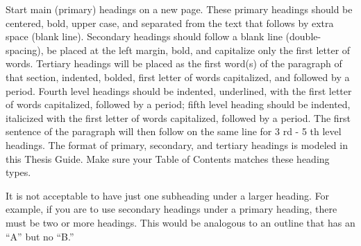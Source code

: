 Start main (primary) headings on a new page. These primary headings should be centered, bold, upper case, and separated from the text that follows by extra space (blank line). Secondary headings should follow a blank line (double-spacing), be placed at the left margin, bold, and capitalize only the first letter of words. Tertiary headings will be placed as the first word(s) of the paragraph of that section, indented, bolded, first letter of words capitalized, and followed by a period. Fourth level headings should be indented, underlined, with the first letter of words capitalized, followed by a period; fifth level heading should be indented, italicized with the first letter of words capitalized, followed by a period. The first sentence of the paragraph will then follow on the same line for 3 rd - 5 th level headings. The format of primary, secondary, and tertiary headings is modeled in this Thesis Guide. Make sure your Table of Contents matches these heading types.

It is not acceptable to have just one subheading under a larger heading. For example, if you are to use secondary headings under a primary heading, there must be two or more headings. This would be analogous to an outline that has an ``A'' but no ``B.''
